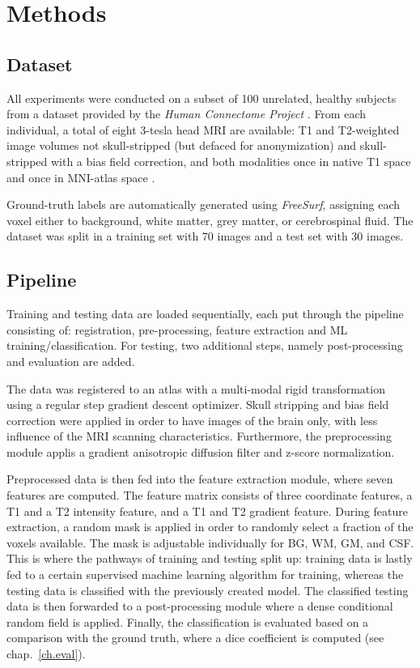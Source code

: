 \documentclass[journal]{IEEEtran}
\begin{document}
\section{Methods}

\subsection{Dataset}
All experiments were conducted on a subset of 100 unrelated, healthy subjects from a dataset provided by the \textit{Human Connectome Project} \cite{van2013wu}. From each individual, a total of eight 3-tesla head MRI are available: T1 and T2-weighted image volumes not skull-stripped (but defaced for anonymization) and skull-stripped with a bias field correction, and both modalities once in native T1 space and once in MNI-atlas space \cite{mazziotta2001probabilistic}.

Ground-truth labels are automatically generated using \textit{FreeSurf}, assigning each voxel either to background, white matter, grey matter, or cerebrospinal fluid. The dataset was split in a training set with 70 images and a test set with 30 images.

\subsection{Pipeline}

Training and testing data are loaded sequentially, each put through the pipeline consisting of: registration, pre-processing, feature extraction and ML training/classification. For testing, two additional steps, namely post-processing and evaluation are added.

The data was registered to an atlas with a multi-modal rigid transformation using a regular step gradient descent optimizer. Skull stripping and bias field correction were applied in order to have images of the brain only, with less influence of the MRI scanning characteristics. Furthermore, the preprocessing module applis a gradient anisotropic diffusion filter and z-score normalization.

Preprocessed data is then fed into the feature extraction module, where seven features are computed. The feature matrix consists of three coordinate features, a T1 and a T2 intensity feature, and a T1 and T2 gradient feature. During feature extraction, a random mask is applied in order to randomly select a fraction of the voxels available. The mask is adjustable individually for BG, WM, GM, and CSF. This is where the pathways of training and testing split up: training data is lastly fed to a certain supervised machine learning algorithm for training, whereas the testing data is classified with the previously created model. The classified testing data is then forwarded to a post-processing module where a dense conditional random field \cite{krahenbuhl2011efficient} is applied.
Finally, the classification is evaluated based on a comparison with the ground truth, where a dice coefficient is computed (see chap.~\ref{ch.eval}).
\end{document}
